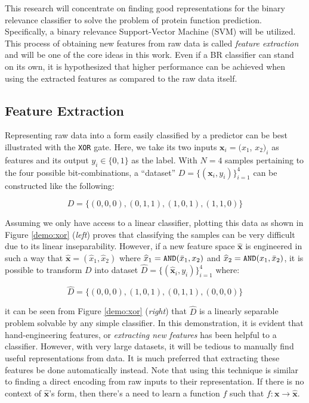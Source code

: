 \par This research will concentrate on finding good representations for the
binary relevance classifier to solve the problem of protein function prediction.
Specifically, a binary relevance Support-Vector Machine (SVM) will be utilized.
This process of obtaining new features from raw data is called \textit{feature extraction}
and will be one of the core ideas in this work. Even if a BR classifier can
stand on its own, it is hypothesized that higher performance can be achieved when
using the extracted features as compared to the raw data itself.

\subsection{Feature Extraction}

\par Representing raw data into a form easily classified by a predictor can be
best illustrated with the \texttt{XOR} gate. Here, we take its two inputs
$\mathbf{x}_{i} = (x_{1}$, $x_{2})_{i}$ as features and its output $y_{i} \in \{0,1\}$ as the
label. With $N=4$ samples pertaining to the four possible bit-combinations,
a ``dataset'' $D=\{(\mathbf{x}_{i},y_{i})\}_{i=1}^{4}$ can be constructed like
the following:

\[
    D = \{(0,0,0), (0,1,1), (1,0,1), (1,1,0)\}
\]

Assuming we only have access to a linear classifier, plotting this data as shown in Figure 
\ref{demo:xor} (\textit{left}) proves that classifying the samples can be very
difficult due to its linear inseparability. However, if a new feature space
$\mathbf{\widehat{x}}$ is engineered in such a way that $\mathbf{\widehat{x}} = (\widehat{x}_{1},
\widehat{x}_2)$ where $\widehat{x}_{1} = \text{\texttt{AND}}(\bar{x}_{1},
x_{2})$ and $\widehat{x}_{2} = \text{\texttt{AND}}(x_{1}, \bar{x}_{2})$, it is possible to transform $D$ into dataset $\widehat{D}=\{(\mathbf{\widehat{x}}_{i}, y_{i})\}_{i=1}^{4}$
where:

\[
    \widehat{D} = \{(0,0,0), (1,0,1), (0,1,1), (0,0,0)\}
\]

\noindent it can be seen from Figure \ref{demo:xor} (\textit{right}) that 
$\widehat{D}$ is a linearly separable problem solvable by any simple classifier. In this
demonstration, it is evident that hand-engineering features, or
\textit{extracting new features} has been helpful to a classifier. However,
with very large datasets, it will be tedious to manually find useful
representations from data. It is much preferred that extracting these features be done
automatically instead. Note that using this technique is similar to finding a direct encoding
from raw inputs to their representation. If there is no context of
$\mathbf{\widehat{x}}$'s form, then there's a need to learn a function $f$ such
that $f: \mathbf{x} \rightarrow \mathbf{\widehat{x}}$.

